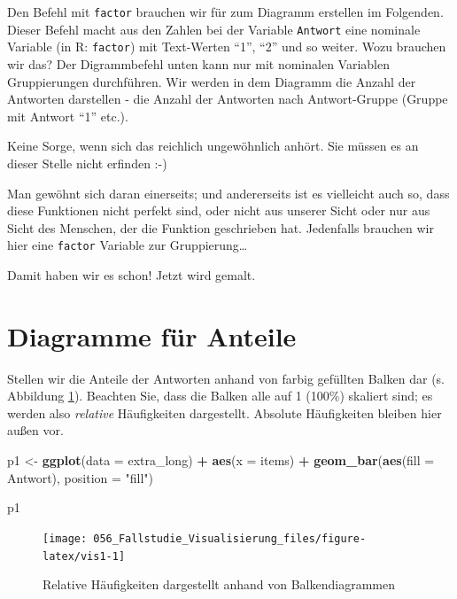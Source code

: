 \documentclass[12pt,ngerman,]{book}
\makeatletter
\newenvironment{Shaded}{\begin{snugshade}}{\end{snugshade}}
\newcommand{\KeywordTok}[1]{\textcolor[rgb]{0.13,0.29,0.53}{\textbf{#1}}}
\newcommand{\DataTypeTok}[1]{\textcolor[rgb]{0.13,0.29,0.53}{#1}}
\newcommand{\StringTok}[1]{\textcolor[rgb]{0.31,0.60,0.02}{#1}}
\newcommand{\OperatorTok}[1]{\textcolor[rgb]{0.81,0.36,0.00}{\textbf{#1}}}
\newcommand{\NormalTok}[1]{#1}
\newenvironment{kframe}{%
\medskip{}
\setlength{\fboxsep}{.8em}
 \def\at@end@of@kframe{}%
 \ifinner\ifhmode%
  \def\at@end@of@kframe{\end{minipage}}%
  \begin{minipage}{\columnwidth}%
 \fi\fi%
 \def\FrameCommand##1{\hskip\@totalleftmargin \hskip-\fboxsep
 \colorbox{shadecolor}{##1}\hskip-\fboxsep
     \hskip-\linewidth \hskip-\@totalleftmargin \hskip\columnwidth}%
 \MakeFramed {\advance\hsize-\width
   \@totalleftmargin\z@ \linewidth\hsize
   \@setminipage}}%
 {\par\unskip\endMakeFramed%
 \at@end@of@kframe}
\renewenvironment{Shaded}{\begin{kframe}}{\end{kframe}}
\theoremstyle{definition}
\theoremstyle{definition}
\theoremstyle{remark}
\makeatother
\begin{document}
Den Befehl mit \texttt{factor} brauchen wir für zum Diagramm erstellen
im Folgenden. Dieser Befehl macht aus den Zahlen bei der Variable
\texttt{Antwort} eine nominale Variable (in R: \texttt{factor}) mit
Text-Werten ``1'', ``2'' und so weiter. Wozu brauchen wir das? Der
Digrammbefehl unten kann nur mit nominalen Variablen Gruppierungen
durchführen. Wir werden in dem Diagramm die Anzahl der Antworten
darstellen - die Anzahl der Antworten nach Antwort-Gruppe (Gruppe mit
Antwort ``1'' etc.).

Keine Sorge, wenn sich das reichlich ungewöhnlich anhört. Sie müssen es
an dieser Stelle nicht erfinden :-)

Man gewöhnt sich daran einerseits; und andererseits ist es vielleicht
auch so, dass diese Funktionen nicht perfekt sind, oder nicht aus
unserer Sicht oder nur aus Sicht des Menschen, der die Funktion
geschrieben hat. Jedenfalls brauchen wir hier eine \texttt{factor}
Variable zur Gruppierung\ldots{}

Damit haben wir es schon! Jetzt wird gemalt.

\section{Diagramme für Anteile}\label{diagramme-fur-anteile}

Stellen wir die Anteile der Antworten anhand von farbig gefüllten Balken
dar (s. Abbildung \ref{fig:vis1}). Beachten Sie, dass die Balken alle
auf 1 (100\%) skaliert sind; es werden also \emph{relative} Häufigkeiten
dargestellt. Absolute Häufigkeiten bleiben hier außen vor.

\begin{Shaded}
\begin{Highlighting}[]
\NormalTok{p1 <-}\StringTok{ }\KeywordTok{ggplot}\NormalTok{(}\DataTypeTok{data =}\NormalTok{ extra_long) }\OperatorTok{+}
\StringTok{  }\KeywordTok{aes}\NormalTok{(}\DataTypeTok{x =}\NormalTok{ items)  }\OperatorTok{+}
\StringTok{  }\KeywordTok{geom_bar}\NormalTok{(}\KeywordTok{aes}\NormalTok{(}\DataTypeTok{fill =}\NormalTok{ Antwort), }\DataTypeTok{position =} \StringTok{"fill"}\NormalTok{) }

\NormalTok{p1}
\end{Highlighting}
\end{Shaded}

\begin{figure}

{\centering \texttt{[image: 056\_Fallstudie\_Visualisierung\_files/figure-latex/vis1-1]} 

}

\caption{Relative Häufigkeiten dargestellt anhand von Balkendiagrammen}\label{fig:vis1}
\end{figure}
\end{document}
